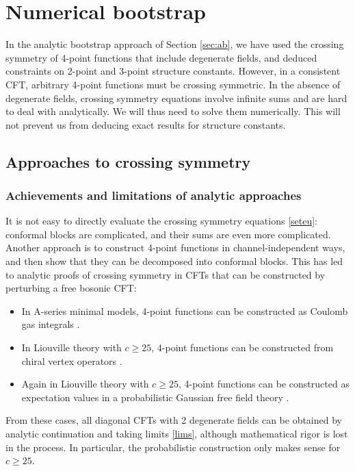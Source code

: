 \documentclass[12pt, a4paper]{article}
\theoremstyle{break}
\begin{document}

\section{Numerical bootstrap}

In the analytic bootstrap approach of Section \ref{sec:ab}, we have used the crossing symmetry of 4-point functions that include degenerate fields, and deduced constraints on 2-point and 3-point structure constants. However, in a consistent CFT, arbitrary 4-point functions must be crossing symmetric. In the absence of degenerate fields, crossing symmetry equations involve infinite sums and are hard to deal with analytically. We will thus need to solve them numerically. This will not prevent us from deducing exact results for structure constants. 

\subsection{Approaches to crossing symmetry}

\subsubsection{Achievements and limitations of analytic approaches}

It is not easy to directly evaluate the crossing symmetry equations \eqref{seteu}: conformal blocks are complicated, and their sums are even more complicated. Another approach is to construct 4-point functions in channel-independent ways, and then show that they can be decomposed into conformal blocks. This has led to analytic proofs of crossing symmetry in CFTs that can be constructed by perturbing a free bosonic CFT:
\begin{itemize}
 \item In A-series minimal models, 4-point functions can be constructed as Coulomb gas integrals \cite{df84}.
 \item In Liouville theory with $c\geq 25$, 4-point functions can be constructed from chiral vertex operators \cite{tes03b}.
 \item Again in Liouville theory with $c\geq 25$, 4-point functions can be constructed as expectation values in a probabilistic Gaussian free field theory \cite{ckrv05}. 
\end{itemize}
From these cases, all diagonal CFTs with 2 degenerate fields can be obtained by analytic continuation and taking limits \eqref{lims}, although mathematical rigor is lost in the process. In particular, the probabilistic construction only makes sense for $c\geq 25$. 
\end{document}
